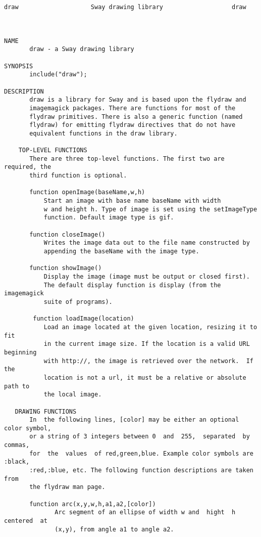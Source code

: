 \color{CodeGreen}
\begin{codesize}
\begin{verbatim}
draw                    Sway drawing library                   draw



NAME
       draw - a Sway drawing library

SYNOPSIS
       include("draw");

DESCRIPTION
       draw is a library for Sway and is based upon the flydraw and
       imagemagick packages. There are functions for most of the
       flydraw primitives. There is also a generic function (named
       flydraw) for emitting flydraw directives that do not have
       equivalent functions in the draw library.

    TOP-LEVEL FUNCTIONS
       There are three top-level functions. The first two are required, the
       third function is optional.

       function openImage(baseName,w,h)
           Start an image with base name baseName with width
           w and height h. Type of image is set using the setImageType
           function. Default image type is gif.

       function closeImage()
           Writes the image data out to the file name constructed by
           appending the baseName with the image type.

       function showImage()
           Display the image (image must be output or closed first).
           The default display function is display (from the imagemagick
           suite of programs).

        function loadImage(location)
           Load an image located at the given location, resizing it to fit
           in the current image size. If the location is a valid URL beginning
           with http://, the image is retrieved over the network.  If the
           location is not a url, it must be a relative or absolute path to
           the local image.

   DRAWING FUNCTIONS
       In  the following lines, [color] may be either an optional color symbol,
       or a string of 3 integers between 0  and  255,  separated  by  commas,
       for  the  values  of red,green,blue. Example color symbols are :black,
       :red,:blue, etc. The following function descriptions are taken from
       the flydraw man page.

       function arc(x,y,w,h,a1,a2,[color])
              Arc segment of an ellipse of width w and  hight  h  centered  at
              (x,y), from angle a1 to angle a2.


\end{verbatim}
\end{codesize}
